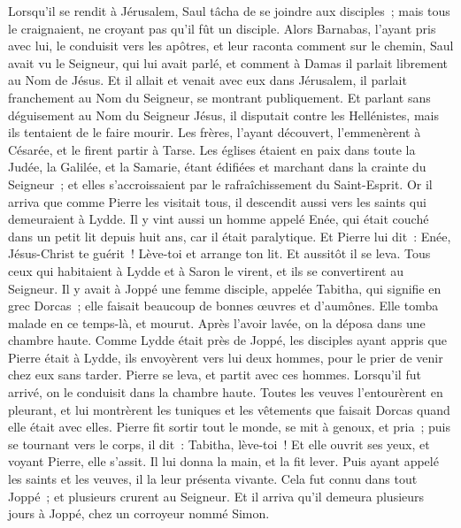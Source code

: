 \begin{multicols}{2}
Lorsqu'il se rendit à Jérusalem, Saul tâcha de se joindre aux disciples~; mais tous le craignaient, ne croyant pas qu'il fût un disciple.
Alors Barnabas, l'ayant pris avec lui, le conduisit vers les apôtres, et leur raconta comment sur le chemin, Saul avait vu le Seigneur, qui lui avait parlé, et comment à Damas il parlait librement au Nom de Jésus.
Et il allait et venait avec eux dans Jérusalem, il parlait franchement au Nom du Seigneur, se montrant publiquement.
Et parlant sans déguisement au Nom du Seigneur Jésus, il disputait contre les Hellénistes, mais ils tentaient de le faire mourir.
Les frères, l'ayant découvert, l'emmenèrent à Césarée, et le firent partir à Tarse.
Les églises étaient en paix dans toute la Judée, la Galilée, et la Samarie, étant édifiées et marchant dans la crainte du Seigneur~; et elles s'accroissaient par le rafraîchissement du Saint-Esprit.
Or il arriva que comme Pierre les visitait tous, il descendit aussi vers les saints qui demeuraient à Lydde.
Il y vint aussi un homme appelé Enée, qui était couché dans un petit lit depuis huit ans, car il était paralytique.
Et Pierre lui dit~: Enée, Jésus-Christ te guérit~! Lève-toi et arrange ton lit. Et aussitôt il se leva.
Tous ceux qui habitaient à Lydde et à Saron le virent, et ils se convertirent au Seigneur.
Il y avait à Joppé une femme disciple, appelée Tabitha, qui signifie en grec Dorcas~; elle faisait beaucoup de bonnes œuvres et d'aumônes.
Elle tomba malade en ce temps-là, et mourut. Après l'avoir lavée, on la déposa dans une chambre haute.
Comme Lydde était près de Joppé, les disciples ayant appris que Pierre était à Lydde, ils envoyèrent vers lui deux hommes, pour le prier de venir chez eux sans tarder.
Pierre se leva, et partit avec ces hommes. Lorsqu'il fut arrivé, on le conduisit dans la chambre haute. Toutes les veuves l'entourèrent en pleurant, et lui montrèrent les tuniques et les vêtements que faisait Dorcas quand elle était avec elles.
Pierre fit sortir tout le monde, se mit à genoux, et pria~; puis se tournant vers le corps, il dit~: Tabitha, lève-toi~! Et elle ouvrit ses yeux, et voyant Pierre, elle s'assit.
Il lui donna la main, et la fit lever. Puis ayant appelé les saints et les veuves, il la leur présenta vivante.
Cela fut connu dans tout Joppé~; et plusieurs crurent au Seigneur.
Et il arriva qu'il demeura plusieurs jours à Joppé, chez un corroyeur nommé Simon.

\end{multicols}
